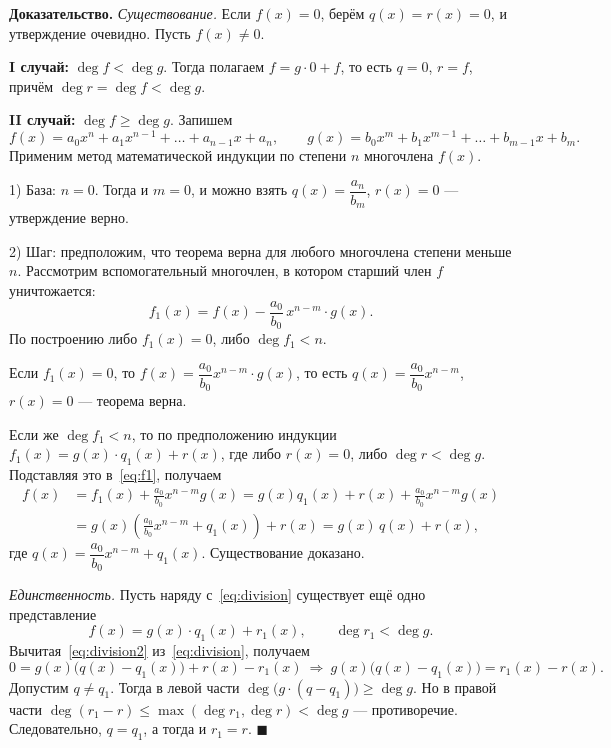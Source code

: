 \documentclass[12pt,a4paper]{article}
\newenvironment{myproof}{\noindent\textbf{Доказательство.}}{\hfill$\blacksquare$}
\begin{document}
\begin{myproof}
  \textit{Существование.} Если $f(x) = 0$, берём $q(x) = r(x) = 0$, и
  утверждение очевидно. Пусть $f(x) \neq 0$.

  \textbf{I случай:} $\deg f < \deg g$. Тогда полагаем
  $f = g \cdot 0 + f$, то есть $q = 0$, $r = f$, причём
  $\deg r = \deg f < \deg g$.

  \textbf{II случай:} $\deg f \ge \deg g$. Запишем
  \[
    f(x) = a_0 x^n + a_1 x^{n-1} + \dots + a_{n-1} x + a_n, \qquad
    g(x) = b_0 x^m + b_1 x^{m-1} + \dots + b_{m-1} x + b_m.
  \]
  Применим метод математической индукции по степени $n$ многочлена
  $f(x)$.

1) База: $n = 0$. Тогда и $m = 0$, и можно взять
$q(x) = \dfrac{a_n}{b_m}$, $r(x) = 0$ — утверждение верно.

2) Шаг: предположим, что теорема верна для любого многочлена степени
меньше $n$. Рассмотрим вспомогательный многочлен, в котором старший
член $f$ уничтожается:
\begin{equation}
f_1(x) = f(x) - \frac{a_0}{b_0}\, x^{n-m} \cdot g(x).
\label{eq:f1}
\end{equation}
По построению либо $f_1(x) = 0$, либо $\deg f_1 < n$.

Если $f_1(x) = 0$, то $f(x) = \dfrac{a_0}{b_0} x^{n-m} \cdot g(x)$,
то есть $q(x) = \dfrac{a_0}{b_0} x^{n-m}$, $r(x) = 0$ — теорема верна.

Если же $\deg f_1 < n$, то по предположению индукции
$f_1(x) = g(x)\cdot q_1(x) + r(x)$, где либо $r(x) = 0$, либо
$\deg r < \deg g$. Подставляя это в~\eqref{eq:f1}, получаем
\begin{align*}
f(x) &= f_1(x) + \frac{a_0}{b_0} x^{n-m} g(x)
= g(x) q_1(x) + r(x) + \frac{a_0}{b_0} x^{n-m} g(x) \\
&= g(x)\left( \frac{a_0}{b_0} x^{n-m} + q_1(x) \right) + r(x)
= g(x)\, q(x) + r(x),
\end{align*}
где $q(x) = \dfrac{a_0}{b_0} x^{n-m} + q_1(x)$. Существование доказано.

\medskip
\textit{Единственность.} Пусть наряду с~\eqref{eq:division}
существует ещё одно представление
\begin{equation}
f(x) = g(x) \cdot q_1(x) + r_1(x), \qquad \deg r_1 < \deg g.
\label{eq:division2}
\end{equation}
Вычитая~\eqref{eq:division2} из~\eqref{eq:division}, получаем
\[
0 = g(x)\bigl(q(x) - q_1(x)\bigr) + r(x) - r_1(x)
\ \Longrightarrow\
g(x)\bigl(q(x) - q_1(x)\bigr) = r_1(x) - r(x).
\]
Допустим $q \neq q_1$. Тогда в левой части
$\deg\bigl(g\cdot(q - q_1)\bigr) \ge \deg g$. Но в правой части
$\deg(r_1 - r) \le \max(\deg r_1, \deg r) < \deg g$ — противоречие.
Следовательно, $q = q_1$, а тогда и $r_1 = r$.
\end{myproof}
\end{document}
